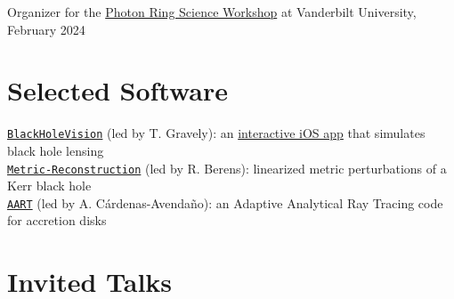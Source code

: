 \documentclass[margin,line]{resume}
\begin{document}
\begin{resume}
Organizer for the \href{https://www.blackholeexplorer.org/events/photon-ring-science-workshop}{Photon Ring Science Workshop} at Vanderbilt University, February 2024

\section{\mysidestyle Selected Software}

\href{https://github.com/graveltr/BlackHoleVision}{\texttt{BlackHoleVision}} (led by T. Gravely): an \href{https://apps.apple.com/us/app/black-hole-vision/id6737292448}{interactive iOS app} that simulates black hole lensing\\
\href{https://github.com/Metric-Reconstruction/metric-reconstruction/}{\texttt{Metric-Reconstruction}} (led by R. Berens): linearized metric perturbations of a Kerr black hole\\
\href{https://github.com/iAART/aart}{\texttt{AART}} (led by A. C\'ardenas-Avenda\~no): an Adaptive Analytical Ray Tracing code for accretion disks

%
%

\section{\mysidestyle Invited Talks}


\end{resume}
\end{document}

